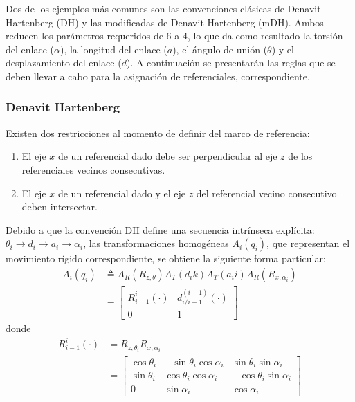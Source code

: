     \noindent Dos de los ejemplos más comunes son las convenciones clásicas de Denavit-Hartenberg (DH) y las modificadas de
    Denavit-Hartenberg (mDH). Ambos reducen los parámetros requeridos de 6 a 4, lo que da como resultado la torsión del enlace
    ($\alpha$), la longitud del enlace ($a$), el ángulo de unión ($\theta$) y el desplazamiento del enlace ($d$).
    \noindent A continuación se presentarán las reglas que se deben llevar a cabo para la asignación de referenciales,
    correspondiente.

    \subsubsection{Denavit Hartenberg}
    \noindent Existen dos restricciones al momento de definir del marco de referencia: 
    \begin{enumerate}
        \item El eje $x$ de un referencial dado debe ser perpendicular al eje $z$ de los referenciales vecinos consecutivas. 
        \item El eje $x$ de un referencial dado y el eje $z$ del referencial vecino consecutivo deben intersectar. 
    \end{enumerate}

    \noindent Debido a que la convención DH define una secuencia intrínseca explícita:
    $\theta_i \rightarrow d_i \rightarrow a_i \rightarrow \alpha_i$, las transformaciones homogéneas $A_i (q_i)$,
    que representan el movimiento rígido correspondiente, se obtiene la siguiente forma particular:
    \begin{align*}
        A_i (q_i) & \triangleq A_R (R_{z,\theta}) A_T (d_i k) A_T (a_i i) A_R (R_{x,\alpha_i}) \\
        & = \left[  \begin{array}{cc}
            R_{i-1}^i (\cdot)  & d_{i/i-1}^{(i-1)} (\cdot) \\
            0 & 1  
    \end{array} \right]
    \end{align*}
    donde
    \begin{align*}
        R_{i-1}^i (\cdot) & = R_{z,\theta_i}  R_{x,\alpha_i} \\ 
        & = \left[  \begin{array}{ccc}
            \cos{\theta_i}  & -\sin{\theta_i}\cos{\alpha_i} & \sin{\theta_i} \sin{\alpha_i} \\
            \sin{\theta_i} &  \cos{\theta_i}\cos{\alpha_i} &
            -\cos{\theta_i}\sin{\alpha_i} \\
            0 & \sin{\alpha_i} & \cos{\alpha_i}
        \end{array} \right]
    \end{align*}

